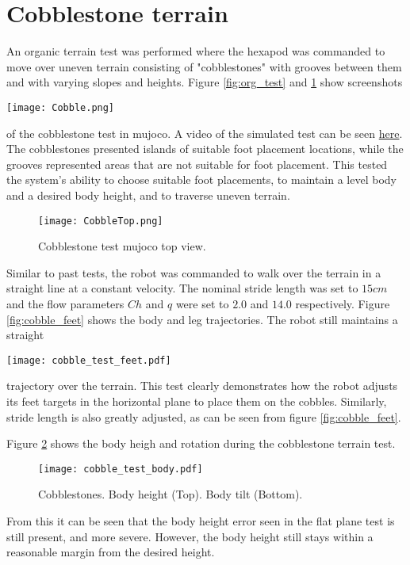     \section{Cobblestone terrain}
    An organic terrain test was performed where the hexapod was commanded to move over uneven terrain consisting of "cobblestones" with grooves between them and with varying slopes and heights. Figure \ref{fig:org_test} and \ref{fig:org_test_top} show screenshots
    \begin{center}
        \texttt{[image: Cobble.png]}
        \label{fig:org_test}
    \end{center}
    of the cobblestone test in \ac{mujoco}. A video of the simulated test can be seen \href{https://youtu.be/-lQjvykGlmY}{here}. The cobblestones presented islands of suitable foot placement locations, while the grooves represented areas that are not suitable for foot placement. This tested the system's ability to choose suitable foot placements, to maintain a level body and a desired body height, and to traverse uneven terrain.
    \begin{figure}[h]
        \centering
        \texttt{[image: CobbleTop.png]}
        \caption{Cobblestone test \ac{mujoco} top view.}
        \label{fig:org_test_top}
    \end{figure}

    \noindent
    Similar to past tests, the robot was commanded to walk over the terrain in a straight line at a constant velocity. The nominal stride length was set to \(15cm\) and the flow parameters \(Ch\) and \(q\) were set to \(2.0\) and \(14.0\) respectively. Figure \ref{fig:cobble_feet} shows the body and leg trajectories. The robot still maintains a straight

    \begin{centering}
        \centering
        \texttt{[image: cobble\_test\_feet.pdf]}
        \label{fig:cobble_feet}
    \end{centering}
    \noindent
    trajectory over the terrain. This test clearly demonstrates how the robot adjusts its feet targets in the horizontal plane to place them on the cobbles. Similarly, stride length is also greatly adjusted, as can be seen from figure \ref{fig:cobble_feet}.

    Figure \ref{fig:cobble_body} shows the body heigh and rotation during the cobblestone terrain test.
    \begin{figure}[h]
        \centering
        \texttt{[image: cobble\_test\_body.pdf]}
        \caption{Cobblestones. Body height (Top). Body tilt (Bottom).}
        \label{fig:cobble_body}
    \end{figure}
    From this it can be seen that the body height error seen in the flat plane test is still present, and more severe. However, the body height still stays within a reasonable margin from the desired height.


